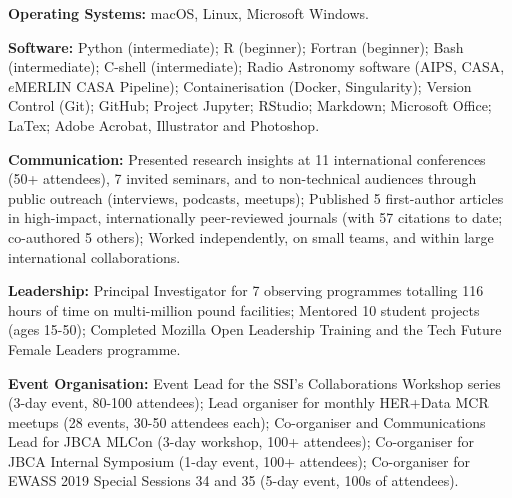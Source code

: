 \begin{cvpubs}
  \cvpub
    {
      \begin{cvlist}
        \item{\textbf{Operating Systems:} macOS, Linux, Microsoft Windows.}
        \item {\textbf{Software:} Python (intermediate); R (beginner); Fortran (beginner); Bash (intermediate); C-shell (intermediate); Radio Astronomy software (AIPS, CASA, $e$MERLIN CASA Pipeline); Containerisation (Docker, Singularity); Version Control (Git); GitHub; Project Jupyter; RStudio; Markdown; Microsoft Office; LaTex; Adobe Acrobat, Illustrator and Photoshop.}
        \item {\textbf{Communication:} Presented research insights at 11 international conferences (50+ attendees), 7 invited seminars, and to non-technical audiences through public outreach (interviews, podcasts, meetups); Published 5 first-author articles in high-impact, internationally peer-reviewed journals (with 57 citations to date; co-authored 5 others); Worked independently, on small teams, and within large international collaborations.}
        \item {\textbf{Leadership:} Principal Investigator for 7 observing programmes totalling 116 hours of time on multi-million pound facilities; Mentored 10 student projects (ages 15-50); Completed Mozilla Open Leadership Training and the Tech Future Female Leaders programme.}
        \item {\textbf{Event Organisation:} Event Lead for the SSI's Collaborations Workshop series (3-day event, 80-100 attendees); Lead organiser for monthly HER+Data MCR meetups (28 events, 30-50 attendees each); Co-organiser and Communications Lead for JBCA MLCon (3-day workshop, 100+ attendees); Co-organiser for JBCA Internal Symposium (1-day event, 100+ attendees); Co-organiser for EWASS 2019 Special Sessions 34 and 35 (5-day event, 100s of attendees).}
      \end{cvlist}
    }
\end{cvpubs}